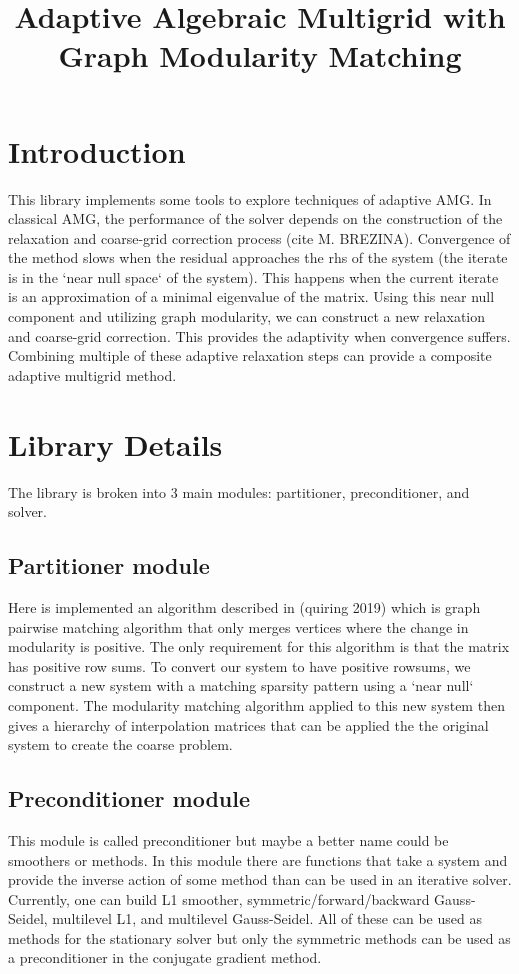 \documentclass[a4paper,12pt]{amsart}
\title{Adaptive Algebraic Multigrid with Graph Modularity Matching}
\numberwithin{equation}{section}
\begin{document}
\maketitle

\section{Introduction}
This library implements some tools to explore techniques of adaptive AMG.
In classical AMG, the performance of the solver depends on the construction
of the relaxation and coarse-grid correction process (cite M. BREZINA).
Convergence of the method slows when the residual approaches the rhs of the
system (the iterate is in the `near null space` of the system).
This happens when the current iterate is an approximation of a minimal
eigenvalue of the matrix. Using this near null component and utilizing graph
modularity, we can construct a new relaxation and coarse-grid correction.
This provides the adaptivity when convergence suffers. Combining multiple of
these adaptive relaxation steps can provide a composite adaptive multigrid method.

\section{Library Details}
The library is broken into 3 main modules: partitioner, preconditioner, and solver.

\subsection{Partitioner module}
Here is implemented an algorithm described in (quiring 2019) which is graph pairwise
matching algorithm that only merges vertices where the change in modularity is
positive. The only requirement for this algorithm is that the matrix has positive
row sums. To convert our system to have positive rowsums, we construct a new system
with a matching sparsity pattern using a `near null` component. The modularity
matching algorithm applied to this new system then gives a hierarchy of interpolation
matrices that can be applied the the original system to create the coarse problem.

\subsection{Preconditioner module}
This module is called preconditioner but maybe a better name could be smoothers or
methods. In this module there are functions that take a system and provide the inverse
action of some method than can be used in an iterative solver. Currently, one can build 
L1 smoother, symmetric/forward/backward Gauss-Seidel, multilevel L1, and multilevel
Gauss-Seidel. All of these can be used as methods for the stationary solver but only
the symmetric methods can be used as a preconditioner in the conjugate gradient method.
\end{document}
